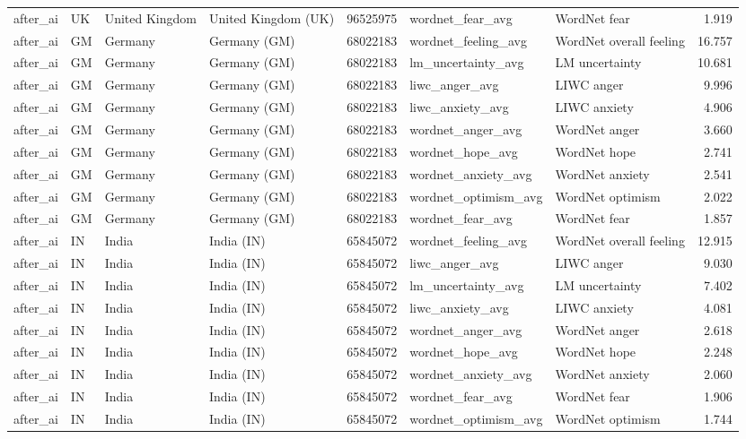\begin{tabular}{llllrllr}
after\_ai & UK & United Kingdom & United Kingdom (UK) & 96525975 & wordnet\_fear\_avg & WordNet fear & 1.919 \\
after\_ai & GM & Germany & Germany (GM) & 68022183 & wordnet\_feeling\_avg & WordNet overall feeling & 16.757 \\
after\_ai & GM & Germany & Germany (GM) & 68022183 & lm\_uncertainty\_avg & LM uncertainty & 10.681 \\
after\_ai & GM & Germany & Germany (GM) & 68022183 & liwc\_anger\_avg & LIWC anger & 9.996 \\
after\_ai & GM & Germany & Germany (GM) & 68022183 & liwc\_anxiety\_avg & LIWC anxiety & 4.906 \\
after\_ai & GM & Germany & Germany (GM) & 68022183 & wordnet\_anger\_avg & WordNet anger & 3.660 \\
after\_ai & GM & Germany & Germany (GM) & 68022183 & wordnet\_hope\_avg & WordNet hope & 2.741 \\
after\_ai & GM & Germany & Germany (GM) & 68022183 & wordnet\_anxiety\_avg & WordNet anxiety & 2.541 \\
after\_ai & GM & Germany & Germany (GM) & 68022183 & wordnet\_optimism\_avg & WordNet optimism & 2.022 \\
after\_ai & GM & Germany & Germany (GM) & 68022183 & wordnet\_fear\_avg & WordNet fear & 1.857 \\
after\_ai & IN & India & India (IN) & 65845072 & wordnet\_feeling\_avg & WordNet overall feeling & 12.915 \\
after\_ai & IN & India & India (IN) & 65845072 & liwc\_anger\_avg & LIWC anger & 9.030 \\
after\_ai & IN & India & India (IN) & 65845072 & lm\_uncertainty\_avg & LM uncertainty & 7.402 \\
after\_ai & IN & India & India (IN) & 65845072 & liwc\_anxiety\_avg & LIWC anxiety & 4.081 \\
after\_ai & IN & India & India (IN) & 65845072 & wordnet\_anger\_avg & WordNet anger & 2.618 \\
after\_ai & IN & India & India (IN) & 65845072 & wordnet\_hope\_avg & WordNet hope & 2.248 \\
after\_ai & IN & India & India (IN) & 65845072 & wordnet\_anxiety\_avg & WordNet anxiety & 2.060 \\
after\_ai & IN & India & India (IN) & 65845072 & wordnet\_fear\_avg & WordNet fear & 1.906 \\
after\_ai & IN & India & India (IN) & 65845072 & wordnet\_optimism\_avg & WordNet optimism & 1.744 \\

\end{tabular}
